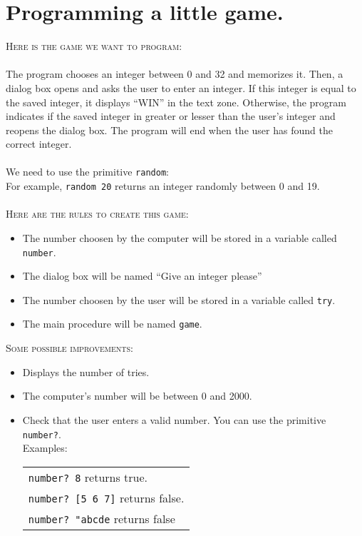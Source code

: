 \section{Programming a little game.}
\noindent \textsc{Here is the game we want to program:}\\ \\
The program chooses an integer between 0 and 32 and memorizes it. Then, a dialog box opens and asks the user to enter an integer. If this integer is equal to the saved integer, it displays ``WIN'' in the text zone. Otherwise, the program indicates if the saved integer in greater or lesser than the user's integer and reopens the dialog box. The program will end when the user has found the correct integer.\\ \\
We need to use the primitive \texttt{random}:\\
For example, \texttt{random 20} returns an integer randomly between 0 and 19.\\ \\
\textsc{Here are the rules to create this game:}
\begin{itemize}
\item The number choosen by the computer will be stored in a variable called \texttt{number}.
\item The dialog box will be named ``Give an integer please''
\item The number choosen by the user will be stored in a variable called \texttt{try}.
\item The main procedure will be named \texttt{game}.
\end{itemize}
\vspace{0.5cm}
\noindent \textsc{Some possible improvements:} \\
\begin{itemize}
\item Displays the number of tries.
\item The computer's number will be between 0 and 2000.
\item Check that the user enters a valid number. You can use the primitive \texttt{number?}. \\
Examples: \begin{tabular}[t]{l}
\texttt{number? 8} returns true.\\
\texttt{number? [5 6 7]} returns false. \\
\texttt{number? "abcde} returns false 
\end{tabular}
\end{itemize}